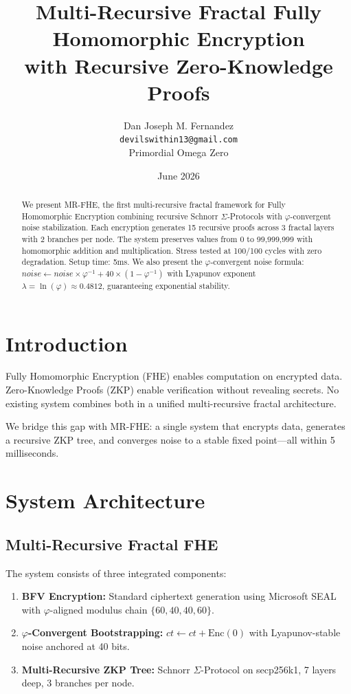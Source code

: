 \documentclass{article}
\title{Multi-Recursive Fractal Fully Homomorphic Encryption\\
with Recursive Zero-Knowledge Proofs}
\author{Dan Joseph M. Fernandez\\
\texttt{devilswithin13@gmail.com}\\
Primordial Omega Zero}
\date{June 2026}
\begin{document}
\maketitle

\begin{abstract}
We present MR-FHE, the first multi-recursive fractal framework for Fully Homomorphic Encryption combining recursive Schnorr $\Sigma$-Protocols with $\varphi$-convergent noise stabilization. Each encryption generates 15 recursive proofs across 3 fractal layers with 2 branches per node. The system preserves values from 0 to 99,999,999 with homomorphic addition and multiplication. Stress tested at 100/100 cycles with zero degradation. Setup time: 5ms. We also present the $\varphi$-convergent noise formula: $noise \leftarrow noise \times \varphi^{-1} + 40 \times (1 - \varphi^{-1})$ with Lyapunov exponent $\lambda = \ln(\varphi) \approx 0.4812$, guaranteeing exponential stability.
\end{abstract}

\section{Introduction}

Fully Homomorphic Encryption (FHE) enables computation on encrypted data. Zero-Knowledge Proofs (ZKP) enable verification without revealing secrets. No existing system combines both in a unified multi-recursive fractal architecture.

We bridge this gap with MR-FHE: a single system that encrypts data, generates a recursive ZKP tree, and converges noise to a stable fixed point—all within 5 milliseconds.

\section{System Architecture}

\subsection{Multi-Recursive Fractal FHE}

The system consists of three integrated components:

\begin{enumerate}
\item \textbf{BFV Encryption:} Standard ciphertext generation using Microsoft SEAL with $\varphi$-aligned modulus chain $\{60, 40, 40, 60\}$.
\item \textbf{$\varphi$-Convergent Bootstrapping:} $ct \leftarrow ct + \text{Enc}(0)$ with Lyapunov-stable noise anchored at 40 bits.
\item \textbf{Multi-Recursive ZKP Tree:} Schnorr $\Sigma$-Protocol on secp256k1, 7 layers deep, 3 branches per node.
\end{enumerate}
\end{document}
